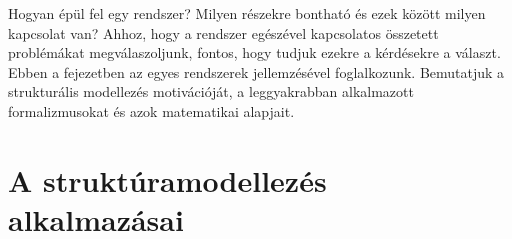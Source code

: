 
\graphicspath{ {./struktura-alapu-modellezes/figures/} }

\newcommand{\yedscale}{0.7}


%	
%	
%	
%	

Hogyan épül fel egy rendszer? Milyen részekre bontható és ezek között milyen kapcsolat van? Ahhoz, hogy a rendszer egészével kapcsolatos összetett problémákat megválaszoljunk, fontos, hogy tudjuk ezekre a kérdésekre a választ. Ebben a fejezetben az egyes rendszerek  jellemzésével foglalkozunk. Bemutatjuk a strukturális modellezés motivációját, a leggyakrabban alkalmazott formalizmusokat és azok matematikai alapjait.



\section{A struktúramodellezés alkalmazásai}
\label{sec:motivacio}

